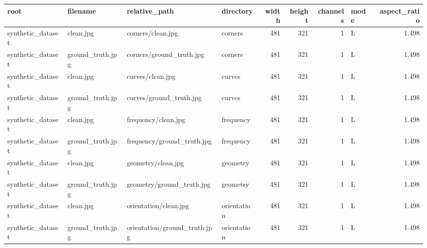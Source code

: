 \begin{tabular}{llllrrrlr}
\toprule
root & filename & relative\_path & directory & width & height & channels & mode & aspect\_ratio \\
\midrule
synthetic\_dataset & clean.jpg & corners/clean.jpg & corners & 481 & 321 & 1 & L & 1.498 \\
synthetic\_dataset & ground\_truth.jpg & corners/ground\_truth.jpg & corners & 481 & 321 & 1 & L & 1.498 \\
synthetic\_dataset & clean.jpg & curves/clean.jpg & curves & 481 & 321 & 1 & L & 1.498 \\
synthetic\_dataset & ground\_truth.jpg & curves/ground\_truth.jpg & curves & 481 & 321 & 1 & L & 1.498 \\
synthetic\_dataset & clean.jpg & frequency/clean.jpg & frequency & 481 & 321 & 1 & L & 1.498 \\
synthetic\_dataset & ground\_truth.jpg & frequency/ground\_truth.jpg & frequency & 481 & 321 & 1 & L & 1.498 \\
synthetic\_dataset & clean.jpg & geometry/clean.jpg & geometry & 481 & 321 & 1 & L & 1.498 \\
synthetic\_dataset & ground\_truth.jpg & geometry/ground\_truth.jpg & geometry & 481 & 321 & 1 & L & 1.498 \\
synthetic\_dataset & clean.jpg & orientation/clean.jpg & orientation & 481 & 321 & 1 & L & 1.498 \\
synthetic\_dataset & ground\_truth.jpg & orientation/ground\_truth.jpg & orientation & 481 & 321 & 1 & L & 1.498 \\
\bottomrule
\end{tabular}
